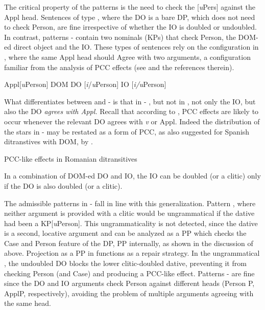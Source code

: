 \documentclass[output=paper,colorlinks,citecolor=brown,nonflat]{langsci/langscibook}
\begin{document}
The critical property of the patterns is the need to check the [\textit{u}Pers] against the Appl head. Sentences of type , where the DO is a bare DP, which does not need to check Person, are fine irrespective of whether the IO is doubled or undoubled. In contrast, patterns - contain two nominals (KPs) that check Person, the DOM-ed direct object and the IO. These types of sentences rely on the configuration in , where the same Appl head should Agree with two arguments, a configuration familiar from the analysis of PCC effects (see  and the references therein).

\ea%
   \label{ex:cornilescu:36}
   Appl[\textit{u}Person] \hspace{0.8cm} DOM DO [\textit{i}/\textit{u}Person] \hspace{0.8cm} IO [\textit{i/u}Person]
   \z



What differentiates between  and - is that in - , but not in , not only the IO, but also the DO \textit{agrees with Appl.} Recall that according to \citet{Preminger2016}, PCC effects are likely to occur whenever the relevant DO agrees with \textit{v} or Appl. Indeed the distribution of the stars in -  may be restated as a form of PCC, as also suggested for Spanish ditranstives with DOM, by \citet{OrmazabalRomero2013Borealis}.

\ea%
   \label{ex:cornilescu:37}
   PCC-like effects in Romanian ditransitives
   \z



In a combination of DOM-ed DO and IO, the IO can be doubled (or a clitic) only if the DO is also doubled (or a clitic).

The admissible patterns in - fall in line with this generalization. Pattern , where neither argument is provided with a clitic would be ungrammatical if the dative had been a KP[\textit{u}Person]. This ungrammaticality is not detected, since the dative is a second, locative argument and can be analyzed as a PP which checks the Case and Person feature of the DP, PP internally, as shown in the discussion of  above. Projection as a PP in  functions as a repair strategy. In the ungrammatical , the undoubled DO blocks the lower clitic-doubled dative, preventing it from checking Person (and Case) and producing a PCC-like effect. Patterns - are fine since the DO and IO arguments check Person against different heads (Person P, ApplP, respectively), avoiding the problem of multiple arguments agreeing with the same head.
\end{document}
